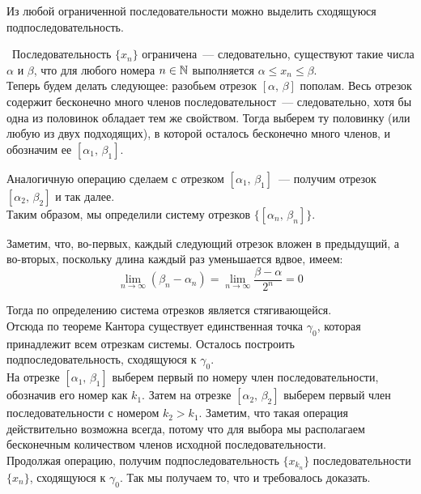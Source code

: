 \begin{theorem}
Из любой ограниченной последовательности можно выделить сходящуюся подпоследовательность.

\vspace{3mm}

\proofname~Последовательность \(\{x_{n}\}\) ограничена~--- следовательно,
существуют такие числа \(\alpha\) и \(\beta\), что для любого номера \(n \in \mathbb{N}\)
выполняется \(\alpha \leq x_{n} \leq \beta\). \\

\indent Теперь будем делать следующее: разобьем отрезок \([\alpha, \, \beta]\) пополам.
Весь отрезок содержит бесконечно много членов последовательност~--- следовательно,
хотя бы одна из половинок обладает тем же свойством.
Тогда выберем ту половинку (или любую из двух подходящих), в которой осталось
бесконечно много членов, и обозначим ее \([\alpha_{1}, \, \beta_{1}]\).

Аналогичную операцию сделаем с отрезком \([\alpha_{1}, \, \beta_{1}]\)~--- 
получим отрезок \([\alpha_{2}, \, \beta_{2}]\) и так далее. \\
\indent Таким образом, мы определили систему отрезков \(\{[\alpha_{n}, \, \beta_{n}]\}\).

Заметим, что, во-первых, каждый следующий отрезок вложен в предыдущий,
а во-вторых, поскольку длина каждый раз уменьшается вдвое, имеем:
\[
\lim_{ n \to \infty } (\beta_{n} - \alpha_{n}) =
\lim_{ n \to \infty } \frac{\beta - \alpha}{2^n} = 0
\]

Тогда по определению система отрезков является стягивающейся.\\
\indent Отсюда по теореме Кантора существует единственная точка \(\gamma_{0}\), которая
принадлежит всем отрезкам системы. Осталось построить подпоследовательность,
сходящуюся к \(\gamma_{0}\).\\

\indent На отрезке \([\alpha_{1}, \, \beta_{1}]\) выберем первый по номеру член последовательности,
обозначив его номер как \(k_{1}\). Затем на отрезке \([\alpha_{2}, \, \beta_{2}]\)
выберем первый член последовательности с номером \(k_{2} > k_{1}\). 
Заметим, что такая операция действительно возможна всегда,
потому что для выбора мы располагаем бесконечным количеством членов
исходной последовательности.\\

Продолжая операцию, получим подпоследовательность \(\{x_{k_{n}}\}\) 
последовательности \(\{x_{n}\}\), сходящуюся к \(\gamma_{0}\).
Так мы получаем то, что и требовалось доказать.~\qedsymbol
\end{theorem}

